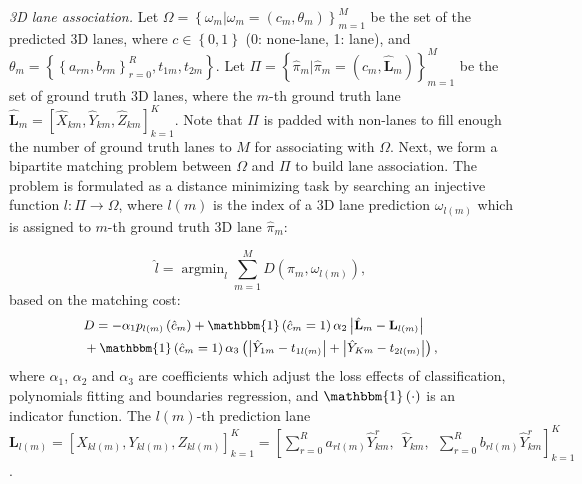 \documentclass[letterpaper]{article} \usepackage{aaai22}  \usepackage{times}  \usepackage{helvet}  \usepackage{courier}  \usepackage[hyphens]{url}  \usepackage{graphicx} \urlstyle{rm} \def\UrlFont{\rm}  \usepackage{natbib}  \usepackage{caption}
\begin{document}
\emph{3D lane association.} Let  $\Omega=\left\{\omega_m|\omega_m=\left(c_m, \theta_m\right)\right\}_{m=1}^{M}$ be
the set of the predicted 3D lanes, where $c \in \left\{0, 1\right\}$ (0: none-lane, 1: lane), and  $\theta_m=\left\{\left\{a_{rm}, b_{rm}\right\}_{r=0}^R, t_{1m}, t_{2m}\right\}$. Let $\Pi=\left\{\hat{\pi}_m|\hat{\pi}_m=\left(\hat{c}_m,\hat{\mathbf{L}}_m\right)\right\}_{m=1}^M$ be the set of ground truth 3D lanes, where the $m$-th ground truth lane $\hat{\mathbf{L}}_m=\left[\hat{X}_{km},\hat{Y}_{km},\hat{Z}_{km}\right]_{k=1}^{K}$. Note that $\Pi$ is padded with non-lanes to fill enough the number of ground truth lanes to $M$ for associating with $\Omega$. Next, we form a bipartite matching problem between $\Omega$ and $\Pi$ to build lane association.
The problem is formulated as a distance minimizing task by searching an injective function $l: \Pi \rightarrow \Omega$, where $l\left(m\right)$ is the index of a 3D lane prediction $\omega_{l\left(m\right)}$ which is assigned to $m$-th ground truth 3D lane $\hat{\pi}_m$:


\begin{equation}
\label{optimalproblem}
\hat{l}=\mathop{\arg\min}_{l} \sum_{m=1}^M D\left(\hat{\pi}_m, \omega_{l\left(m\right)}\right),
\end{equation}
based on the matching cost:
\begin{equation}\small
\label{matchingcost}
\begin{split}
& D =  - \alpha_1 p_{l\left(m\right)}\left(\hat{c}_m\right) + \mathbbm{1}\left(\hat{c}_m = 1\right) \alpha_2  \left|\hat{\mathbf{L}}_m - \mathbf{L}_{l\left(m\right)} \right| \\
& + \mathbbm{1}\left(\hat{c}_m = 1\right) \alpha_3 \left(\left|\hat{Y}_{1m} - t_{1l\left(m\right)}\right| + \left|\hat{Y}_{Km} - t_{2l\left(m\right)} \right|\right),
\end{split}
\end{equation}
where $\alpha_1$, $\alpha_2$ and $\alpha_3$ are coefficients which adjust the loss effects of classification, polynomials fitting and boundaries regression, and $\mathbbm{1}\left(\cdot\right)$ is an indicator function. The $l\left(m\right)$-th prediction lane $\mathbf{L}_{l\left(m\right)}=\left[X_{kl\left(m\right)}, Y_{kl\left(m\right)}, Z_{kl\left(m\right)}\right]_{k=1}^K=\left[\sum_{r=0}^R a_{rl\left(m\right)} \hat{Y}_{km}^r,~~\hat{Y}_{km},~~\sum_{r=0}^R b_{rl\left(m\right)} \hat{Y}_{km}^r\right]_{k=1}^K$.
\end{document}
